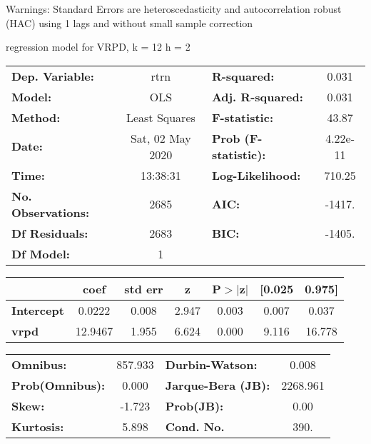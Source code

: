 Warnings: \newline
 [1] Standard Errors are heteroscedasticity and autocorrelation robust (HAC) using 1 lags and without small sample correction\ 

regression model for VRPD, k = 12 h = 2\begin{center}
\begin{tabular}{lclc}
\toprule
\textbf{Dep. Variable:}    &       rtrn       & \textbf{  R-squared:         } &     0.031   \\
\textbf{Model:}            &       OLS        & \textbf{  Adj. R-squared:    } &     0.031   \\
\textbf{Method:}           &  Least Squares   & \textbf{  F-statistic:       } &     43.87   \\
\textbf{Date:}             & Sat, 02 May 2020 & \textbf{  Prob (F-statistic):} &  4.22e-11   \\
\textbf{Time:}             &     13:38:31     & \textbf{  Log-Likelihood:    } &    710.25   \\
\textbf{No. Observations:} &        2685      & \textbf{  AIC:               } &    -1417.   \\
\textbf{Df Residuals:}     &        2683      & \textbf{  BIC:               } &    -1405.   \\
\textbf{Df Model:}         &           1      & \textbf{                     } &             \\
\bottomrule
\end{tabular}
\begin{tabular}{lcccccc}
                   & \textbf{coef} & \textbf{std err} & \textbf{z} & \textbf{P$> |$z$|$} & \textbf{[0.025} & \textbf{0.975]}  \\
\midrule
\textbf{Intercept} &       0.0222  &        0.008     &     2.947  &         0.003        &        0.007    &        0.037     \\
\textbf{vrpd}      &      12.9467  &        1.955     &     6.624  &         0.000        &        9.116    &       16.778     \\
\bottomrule
\end{tabular}
\begin{tabular}{lclc}
\textbf{Omnibus:}       & 857.933 & \textbf{  Durbin-Watson:     } &    0.008  \\
\textbf{Prob(Omnibus):} &   0.000 & \textbf{  Jarque-Bera (JB):  } & 2268.961  \\
\textbf{Skew:}          &  -1.723 & \textbf{  Prob(JB):          } &     0.00  \\
\textbf{Kurtosis:}      &   5.898 & \textbf{  Cond. No.          } &     390.  \\
\bottomrule
\end{tabular}
\end{center}

